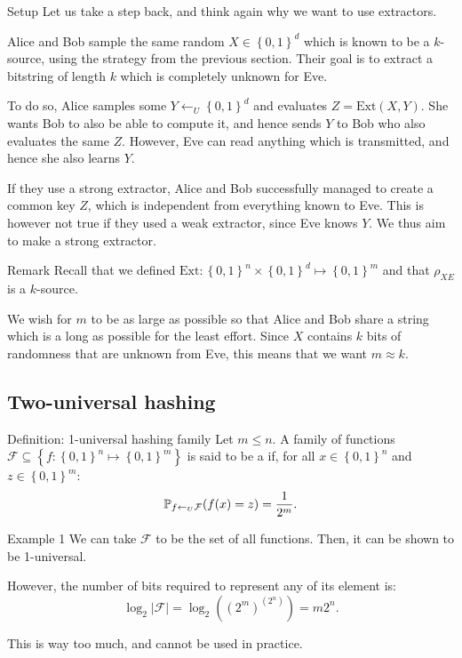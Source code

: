 \documentclass[a4paper]{article}
\begin{document}
\begin{parag}{Setup}
    Let us take a step back, and think again why we want to use extractors.

    Alice and Bob sample the same random $X \in \left\{0, 1\right\}^d$ which is known to be a $k$-source, using the strategy from the previous section. Their goal is to extract a bitstring of length $k$ which is completely unknown for Eve.

    To do so, Alice samples some $Y \leftarrow_U \left\{0, 1\right\}^d$ and evaluates $Z = \text{Ext}\left(X, Y\right)$. She wants Bob to also be able to compute it, and hence sends $Y$ to Bob who also evaluates the same $Z$. However, Eve can read anything which is transmitted, and hence she also learns $Y$.

    If they use a strong extractor, Alice and Bob successfully managed to create a common key $Z$, which is independent from everything known to Eve. This is however not true if they used a weak extractor, since Eve knows $Y$. We thus aim to make a strong extractor.

    \begin{subparag}{Remark}
        Recall that we defined $\text{Ext}: \left\{0, 1\right\}^n \times \left\{0, 1\right\}^d \mapsto \left\{0, 1\right\}^m$ and that $\rho_{XE}$ is a $k$-source.

        We wish for $m$ to be as large as possible so that Alice and Bob share a string which is a long as possible for the least effort. Since $X$ contains $k$ bits of randomness that are unknown from Eve, this means that we want $m \approx k$.
    \end{subparag}
\end{parag}

\subsection{Two-universal hashing}

\begin{parag}{Definition: 1-universal hashing family}
    Let $m \leq n$. A family of functions $\mathcal{F} \subseteq \left\{f: \left\{0, 1\right\}^n \mapsto \left\{0, 1\right\}^m\right\}$ is said to be a  if, for all $x \in \left\{0, 1\right\}^n$ and $z \in \left\{0, 1\right\}^m$: 
    \[\prob_{f \leftarrow_U \mathcal{F}}\left(f\left(x\right) = z\right) = \frac{1}{2^m}.\]
\end{parag}

\begin{parag}{Example 1}
    We can take $\mathcal{F}$ to be the set of all functions. Then, it can be shown to be 1-universal.

    However, the number of bits required to represent any of its element is: 
    \[\log_2 \left|\mathcal{F}\right| = \log_2\left(\left(2^m\right)^{\left(2^n\right)}\right) = m2^n.\]
    
    This is way too much, and cannot be used in practice.
\end{parag}
\end{document}
